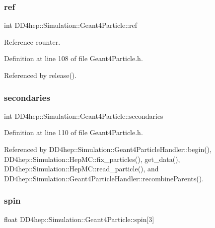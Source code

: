\subsubsection{\texorpdfstring{ref}{ref}}
{\footnotesize\ttfamily int D\+D4hep\+::\+Simulation\+::\+Geant4\+Particle\+::ref}



Reference counter. 



Definition at line 108 of file Geant4\+Particle.\+h.



Referenced by release().

\hypertarget{class_d_d4hep_1_1_simulation_1_1_geant4_particle_ac27f420d9419ca31a1506cc6ac419043}{}\label{class_d_d4hep_1_1_simulation_1_1_geant4_particle_ac27f420d9419ca31a1506cc6ac419043} 
\subsubsection{\texorpdfstring{secondaries}{secondaries}}
{\footnotesize\ttfamily int D\+D4hep\+::\+Simulation\+::\+Geant4\+Particle\+::secondaries}



Definition at line 110 of file Geant4\+Particle.\+h.



Referenced by D\+D4hep\+::\+Simulation\+::\+Geant4\+Particle\+Handler\+::begin(), D\+D4hep\+::\+Simulation\+::\+Hep\+M\+C\+::fix\+\_\+particles(), get\+\_\+data(), D\+D4hep\+::\+Simulation\+::\+Hep\+M\+C\+::read\+\_\+particle(), and D\+D4hep\+::\+Simulation\+::\+Geant4\+Particle\+Handler\+::recombine\+Parents().

\hypertarget{class_d_d4hep_1_1_simulation_1_1_geant4_particle_a643cb972021cf9fe80163bbcab1525ef}{}\label{class_d_d4hep_1_1_simulation_1_1_geant4_particle_a643cb972021cf9fe80163bbcab1525ef} 
\subsubsection{\texorpdfstring{spin}{spin}}
{\footnotesize\ttfamily float D\+D4hep\+::\+Simulation\+::\+Geant4\+Particle\+::spin\mbox{[}3\mbox{]}}



